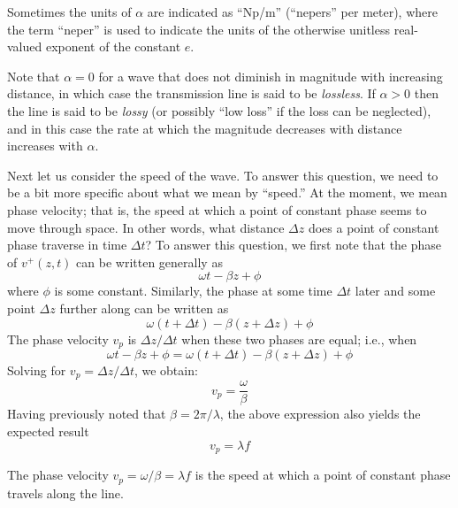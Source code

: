 Sometimes the units of $\alpha$ are indicated as ``Np/m'' (``nepers'' per meter), where the term ``neper'' 
is used to indicate the units of the otherwise unitless real-valued exponent of the constant $e$.

Note that $\alpha=0$ for a wave that does not diminish in magnitude with increasing distance, in which case the transmission line is said to be \emph{lossless}.
If $\alpha>0$ then the line is said to be \emph{lossy} (or possibly ``low loss'' if the loss can be neglected), 
and in this case the rate at which the magnitude decreases with distance increases with $\alpha$.  

Next let us consider the speed of the wave.
To answer this question, we need to be a bit more specific about what we mean by ``speed.''
At the moment, we mean phase velocity; 
that is, the speed at which a point of constant phase seems to move through space.
In other words, what distance $\Delta z$ does a point of constant phase traverse in time $\Delta t$?
To answer this question, we first note that the phase of $v^+(z,t)$ can be written generally as 
%
\begin{equation}
\omega t - \beta z + \phi
\nonumber
\end{equation}
%
where $\phi$ is some constant.  
Similarly, the phase at some time $\Delta t$ later and some point $\Delta z$ further along can be written as 
%
\begin{equation}
\omega \left( t +\Delta t \right) - \beta \left( z +\Delta z \right) + \phi
\nonumber
\end{equation}
The phase velocity $v_p$ is $\Delta z/\Delta t$ when these two phases are equal; i.e., when
%
\begin{equation}
\omega t - \beta z + \phi = \omega \left( t +\Delta t \right) - \beta \left( z +\Delta z \right) + \phi
\nonumber
\end{equation}   
%
Solving for $v_p=\Delta z/\Delta t$, we obtain:
%
\begin{equation}
\boxed{ v_p = \frac{\omega}{\beta} }
\end{equation}
%
Having previously noted that $\beta = 2\pi/\lambda$, the above expression also yields the expected result
%
\begin{equation}
\boxed{
v_p = \lambda f
}
\end{equation}
%
\begin{mdframed}[backgroundcolor=yellow!20,nobreak=true] 
The phase velocity 
$v_p = \omega/\beta = \lambda f$ is the speed at which a point of constant phase travels along the line.
\end{mdframed}

